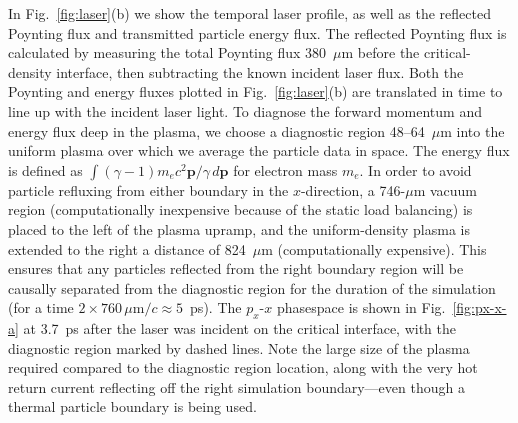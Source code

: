 \documentclass[../absorber.tex]{subfiles}
\begin{document}

In Fig.~\ref{fig:laser}(b) we show the temporal laser profile, as well as the reflected Poynting flux and
transmitted particle energy flux.  The reflected Poynting flux is calculated by measuring the total Poynting flux 380~$\mu$m before the critical-density interface, then subtracting the known incident laser flux.  Both the Poynting and energy fluxes plotted in Fig.~\ref{fig:laser}(b) are translated in time to line up with the incident laser light.  To diagnose the forward momentum and energy flux deep in the plasma, we choose a diagnostic region 48--64~$\mu$m into the uniform plasma over which we average the particle data in space.  The energy flux is defined as $\int (\gamma-1)m_ec^2 \mathbf{p}/\gamma\,d\mathbf{p}$ for electron mass $m_e$.  In order to avoid particle refluxing from either boundary in the $x$-direction, a 746-$\mu$m vacuum region (computationally inexpensive because of the static load balancing) is placed to the left of the plasma upramp, and the uniform-density plasma is extended to the right a distance of 824~$\mu$m (computationally expensive).  This ensures that any particles reflected from the right boundary region will be causally separated from the diagnostic region for the duration of the simulation (for a time $2\times 760\,\mu$m$/c\approx5$~ps).  The $p_x$-$x$ phasespace is shown in Fig.~\ref{fig:px-x-a} at 3.7~ps after the laser was incident on the critical interface, with the diagnostic region marked by dashed lines.  Note the large size of the plasma required compared to the diagnostic region location, along with the very hot return current reflecting off the right simulation boundary---even though a thermal particle boundary is being used.
\end{document}
